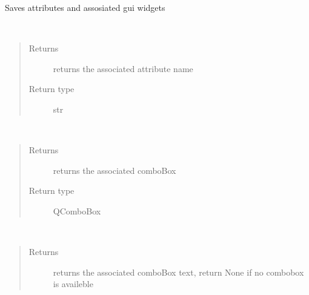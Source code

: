 \documentclass[letterpaper,10pt,english]{sphinxmanual}
\begin{document}
\begin{fulllineitems}
\label{\detokenize{code:AttributeForm.AttributeForm}}
Saves attributes and assosiated gui widgets

\begin{fulllineitems}
\label{\detokenize{code:AttributeForm.AttributeForm.getAttribute}}~\begin{quote}\begin{description}
\item[{Returns}] \leavevmode
returns the associated attribute name

\item[{Return type}] \leavevmode
str

\end{description}\end{quote}

\end{fulllineitems}


\begin{fulllineitems}
\label{\detokenize{code:AttributeForm.AttributeForm.getComboBox}}~\begin{quote}\begin{description}
\item[{Returns}] \leavevmode
returns the associated comboBox

\item[{Return type}] \leavevmode
QComboBox

\end{description}\end{quote}

\end{fulllineitems}


\begin{fulllineitems}
\label{\detokenize{code:AttributeForm.AttributeForm.getComboBoxCurrentText}}~\begin{quote}\begin{description}
\item[{Returns}] \leavevmode
returns the associated comboBox text, return None if no combobox is availeble


\end{description}
\end{quote}
\end{fulllineitems}
\end{fulllineitems}
\end{document}
